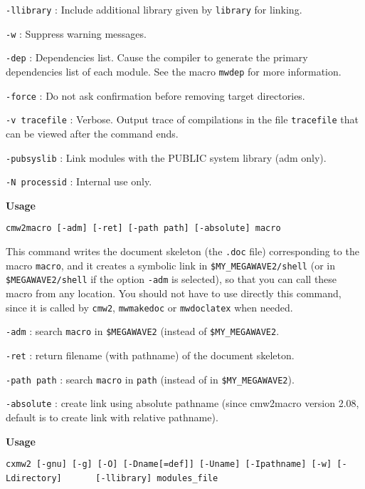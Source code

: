 \verb+-llibrary+ : Include additional library given by \verb+library+ for linking.

\verb+-w+ : Suppress warning messages.

\verb+-dep+ : Dependencies list. Cause the compiler to generate the primary dependencies list of each module. See the macro \verb+mwdep+ for more information.

\verb+-force+ : Do not ask confirmation before removing target directories.

\verb+-v tracefile+ : Verbose. Output trace of compilations in the file \verb+tracefile+ that can be viewed after the command ends.

\verb+-pubsyslib+ : Link modules with the PUBLIC system library (adm only).

\verb+-N processid+ : Internal use only.

\newpage

{\Large\bf Usage} \bigskip

\verb+cmw2macro [-adm] [-ret] [-path path] [-absolute] macro+

\Next

\Description
This command writes the document skeleton (the \verb+.doc+ file) 
corresponding to the macro \verb+macro+, and it creates a symbolic
link in \verb+$MY_MEGAWAVE2/shell+ (or in \verb+$MEGAWAVE2/shell+ if 
the option \verb+-adm+ is selected), so that you can call these macro
from any location. 
You should not have to use directly this command, since it is called by
\verb+cmw2+, \verb+mwmakedoc+ or \verb+mwdoclatex+ when needed.
\Next

\Options 
\verb+-adm+ : search \verb+macro+ in \verb+$MEGAWAVE2+ (instead of 
\verb+$MY_MEGAWAVE2+.

\verb+-ret+ : return filename (with pathname) of the document skeleton.

\verb+-path path+ : search \verb+macro+ in \verb+path+ (instead of 
in \verb+$MY_MEGAWAVE2+).

\verb+-absolute+ : create link using absolute pathname (since cmw2macro version 2.08,
default is to create link with relative pathname).

\newpage

{\Large\bf Usage} \bigskip

\verb+cxmw2 [-gnu] [-g] [-O] [-Dname[=def]] [-Uname] [-Ipathname] [-w] [-Ldirectory]+
\newline
\verb+      [-llibrary] modules_file+

